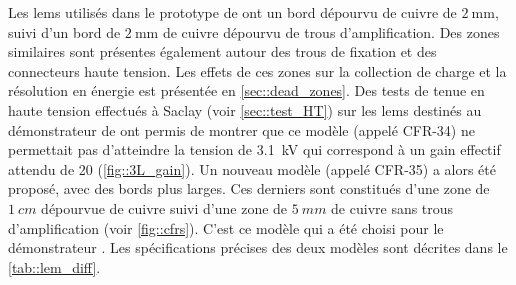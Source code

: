       Les \glspl{lem} utilisés dans le prototype de \TOO{} ont un bord dépourvu de cuivre de $\SI{2}{\milli\meter}$, suivi d'un bord de $\SI{2}{\milli\meter}$ de cuivre dépourvu de trous d'amplification. Des zones similaires sont présentes également autour des trous de fixation et des connecteurs haute tension. Les effets de ces zones sur la collection de charge et la résolution en énergie est présentée en \autoref{sec::dead_zones}. Des tests de tenue en haute tension effectués à Saclay (voir \autoref{sec::test_HT}) sur les \glspl{lem} destinés au démonstrateur de \SSS{} ont permis de montrer que ce modèle (appelé CFR-34) ne permettait pas d'atteindre la tension de \SI{3.1}{\kilo\volt} qui correspond à un gain effectif attendu de 20 (\autoref{fig::3L_gain}). Un nouveau modèle (appelé CFR-35) a alors été proposé, avec des bords plus larges. Ces derniers sont constitués d'une zone de $\SI{1}{cm}$ dépourvue de cuivre suivi d'une zone de $\SI{5}{mm}$ de cuivre sans trous d'amplification  (voir \autoref{fig::cfrs}). C'est ce modèle qui a été choisi pour le démonstrateur \SSS{}. Les spécifications précises des deux modèles sont décrites dans le \autoref{tab::lem_diff}.
            
